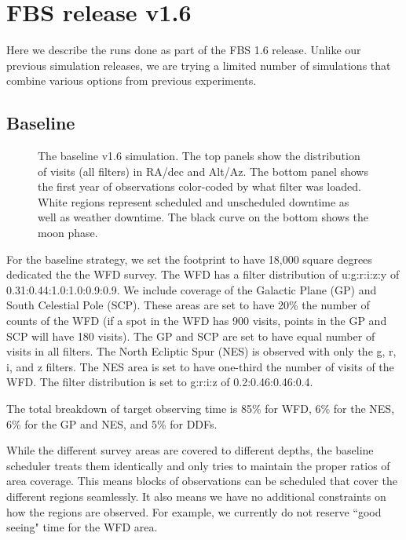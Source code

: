 
\section{FBS release v1.6}

Here we describe the runs done as part of the FBS 1.6 release.  Unlike our previous simulation releases, we are trying a limited number of simulations that combine various options from previous experiments.


\subsection{Baseline}

\begin{figure}
\caption{The baseline v1.6 simulation. The top panels show the distribution of visits (all filters) in RA/dec and Alt/Az. The bottom panel shows the first year of observations color-coded by what filter was loaded. White regions represent scheduled and unscheduled downtime as well as weather downtime. The black curve on the bottom shows the moon phase.}\label{fig:baseline1.6}
\end{figure}


For the baseline strategy, we set the footprint to have 18,000 square degrees dedicated the the WFD survey. The WFD has a filter distribution of u:g:r:i:z:y of 0.31:0.44:1.0:1.0:0.9:0.9. 
We include coverage of the Galactic Plane (GP) and South Celestial Pole (SCP). These areas are set to have 20\% the number of counts of the WFD (if a spot in the WFD has 900 visits, points in the GP and SCP will have 180 visits). The GP and SCP are set to have equal number of visits in all filters.  The North Ecliptic Spur (NES) is observed with only the g, r, i, and z filters. The NES area is set to have one-third the number of visits of the WFD.  The filter distribution is set to g:r:i:z of 0.2:0.46:0.46:0.4. 

The total breakdown of target observing time is 85\% for WFD, 6\% for the NES, 6\% for the GP and NES, and 5\% for DDFs.


While the different survey areas are covered to different depths, the baseline scheduler treats them identically and only tries to maintain the proper ratios of area coverage. This means blocks of observations can be scheduled that cover the different regions seamlessly. It also means we have no additional constraints on how the regions are observed. For example, we currently do not reserve ``good seeing" time for the WFD area. 

